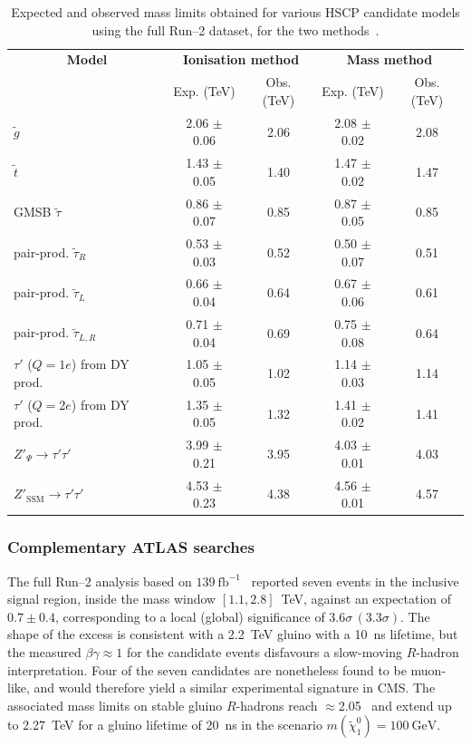 \begin{table}[ht!]
    \centering
    \small
    \begin{tabular}{lcccc} 
     \multicolumn{1}{c}{\textbf{Model}} & \multicolumn{2}{c}{\textbf{Ionisation method}} & \multicolumn{2}{c}{\textbf{Mass method}} \\
				       & Exp. (TeV) & Obs. (TeV) & Exp. (TeV)  & Obs. (TeV) \\ 
                   \hline
	  $\tilde{g}$ & 2.06 $\pm$ 0.06 & 2.06  & 2.08 $\pm$ 0.02  & 2.08  \\
    $\tilde{t}$ & 1.43 $\pm$ 0.05 & 1.40  & 1.47 $\pm$ 0.02  & 1.47  \\
	  GMSB $\tilde{\tau}$ & 0.86 $\pm$ 0.07 & 0.85  & 0.87 $\pm$ 0.05  & 0.85 \\
    pair-prod. $\tilde{\tau}_R$ & 0.53 $\pm$ 0.03 & 0.52  & 0.50 $\pm$ 0.07  & 0.51  \\
    pair-prod. $\tilde{\tau}_L$ & 0.66 $\pm$ 0.04 & 0.64  & 0.67 $\pm$ 0.06  & 0.61  \\
    pair-prod. $\tilde{\tau}_{L,R}$ & 0.71 $\pm$ 0.04 & 0.69  & 0.75 $\pm$ 0.08  & 0.64  \\
    $\tau'$ ($Q=1e$) from DY prod. & 1.05 $\pm$ 0.05 & 1.02  & 1.14 $\pm$ 0.03  & 1.14  \\
    $\tau'$ ($Q=2e$) from DY prod. & 1.35 $\pm$ 0.05 & 1.32  & 1.41 $\pm$ 0.02  & 1.41  \\
    $Z'_\Psi \to \tau'\tau'$ & 3.99 $\pm$ 0.21 & 3.95  & 4.03 $\pm$ 0.01 & 4.03  \\
    $Z'_{\mathrm{SSM}} \to \tau'\tau'$ & 4.53 $\pm$ 0.23 & 4.38  & 4.56 $\pm$ 0.01 & 4.57  \\ 
  \end{tabular}
  \caption{Expected and observed mass limits obtained for various HSCP candidate models using the full Run--2 dataset, for the two methods~\cite{HSCP_Run2}.}
  \label{tab:MassLimits_Run2} 
\end{table}


\subsubsection{Complementary ATLAS searches}

The full Run--2 analysis based on $139~\text{fb}^{-1}$~\cite{HSCP_ATLAS_2022} reported seven events in the inclusive signal region, inside the mass window $[1.1, 2.8]$~TeV, against an expectation of $0.7 \pm 0.4$, corresponding to a local (global) significance of $3.6\sigma\,(3.3\sigma)$. The shape of the excess is consistent with a 2.2~TeV gluino with a 10~ns lifetime, but the measured $\beta\gamma \approx 1$ for the candidate events disfavours a slow-moving $R$-hadron interpretation. Four of the seven candidates are nonetheless found to be muon-like, and would therefore yield a similar experimental signature in CMS. The associated mass limits on stable gluino $R$-hadrons reach $\approx$2.05~ and extend up to 2.27~TeV for a gluino lifetime of 20~ns in the scenario $m(\tilde{\chi}^0_1) = 100~\text{GeV}$.

